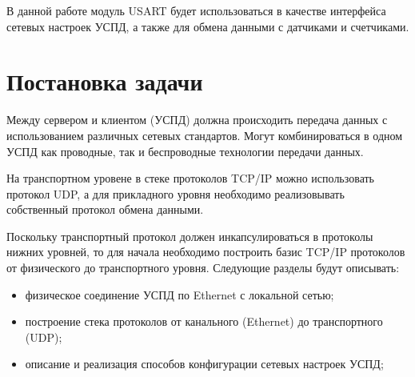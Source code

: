 В данной работе модуль USART будет использоваться в качестве интерфейса сетевых настроек УСПД, а также для обмена данными с датчиками и счетчиками.

\newpage

\section{Постановка задачи}

Между сервером и клиентом (УСПД) должна происходить передача данных с использованием различных сетевых стандартов. Могут комбинироваться в одном УСПД как проводные, так и беспроводные технологии передачи данных.

На транспортном уровене в стеке протоколов TCP/IP можно использовать протокол UDP, а для прикладного уровня необходимо реализовывать собственный протокол обмена данными. 

Поскольку транспортный протокол должен инкапсулироваться в протоколы нижних уровней, то для начала необходимо построить базис TCP/IP протоколов от физического до транспортного уровня. Следующие разделы будут описывать:
\begin{itemize}
\item физическое соединение УСПД по Ethernet с локальной сетью;
\item построение стека протоколов от канального (Ethernet) до транспортного (UDP);
\item описание и реализация способов конфигурации сетевых настроек УСПД;
\end{itemize}


